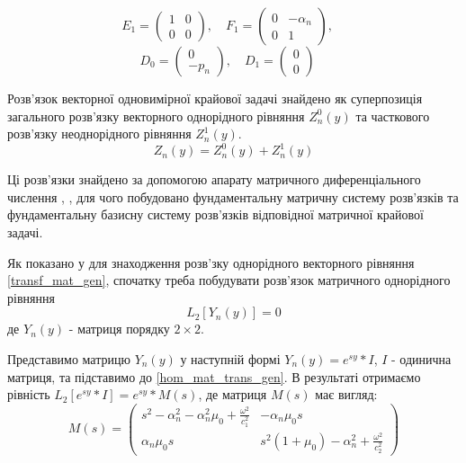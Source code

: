 \begin{equation*}
    E_1 = \begin{pmatrix}
        1 & 0 \\
        0 & 0
    \end{pmatrix}, \quad
    F_1 = \begin{pmatrix}
        0 & -\alpha_n \\
        0 & 1
    \end{pmatrix}, \quad
\end{equation*}
\begin{equation*}
    D_0 = \begin{pmatrix}
        0 \\
        -p_n
    \end{pmatrix}, \quad
    D_1 = \begin{pmatrix}
        0 \\
        0
    \end{pmatrix} \quad
\end{equation*}

Розв'язок векторної одновимірної крайової задачі знайдено як суперпозиція загального розв'язку векторного однорідного рівняння $Z_n^0(y)$
та часткового розв'язку неоднорідного рівняння $Z_n^1(y)$.
\begin{equation}
    Z_n(y) = Z_n^0(y) + Z_n^1(y)
\end{equation}

Ці розв'язки знайдено за допомогою апарату матричного диференціального числення \cite{popov_4}, \cite{gantmaher},
для чого побудовано фундаментальну матричну систему розв'язків та фундаментальну базисну систему розв'язків відповідної матричної крайової задачі.

Як показано у \cite{popov_4} для знаходження розв'зку однорідного векторного рівняння \eqref{transf_mat_gen},
спочатку треба побудувати розв'язок матричного однорідного рівняння
\begin{equation}\label{hom_mat_trans_gen}
    L_2\left[ Y_n(y) \right] = 0
\end{equation}
де $Y_n(y)$ - матриця порядку $2\times2$.

Представимо матрицю $Y_n(y)$ у наступній формі $Y_n(y) = e^{sy}*I$, $I$ - одинична матриця, та підставимо до \eqref{hom_mat_trans_gen}.
В результаті отримаємо рівність $L_2\left[ e^{sy}*I \right] = e^{sy} * M(s)$, де матриця $M(s)$ має вигляд:
\begin{equation}
    M(s) = \begin{pmatrix}
        s^2 - \alpha_n^2 - \alpha_n^2\mu_0 + \frac{\omega^2}{c_1^2} & -\alpha_n \mu_0 s \\
        \alpha_n \mu_0 s & s^2 (1 + \mu_0) -\alpha_n^2 + \frac{\omega^2}{c_2^2}
     \end{pmatrix}
\end{equation}


